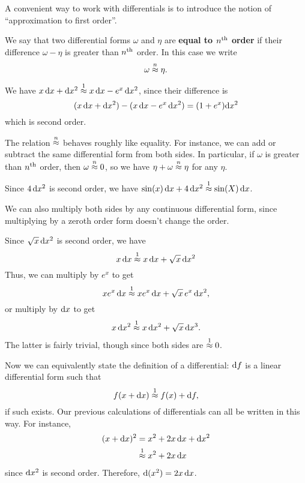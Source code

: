 \documentclass[12pt]{amsart}
\begin{document}
A convenient way to work with differentials is to introduce the notion of ``approximation to first order''.

\begin{defn}
  We say that two differential forms $\omega$ and $\eta$ are \textbf{equal to $n^{\mathrm{th}}$ order} if their difference $\omega-\eta$ is greater than $n^{\mathrm{th}}$ order.
  In this case we write
  \[\omega\mathrel{\overset{n}{\approx}} \eta.\]
\end{defn}

\begin{eg}
  We have $x\,\mathrm{d} x + \mathrm{d} x^2 \mathrel{\overset{1}{\approx}} x\,\mathrm{d} x - e^x \,\mathrm{d} x^2$, since their difference is
  \[ (x\,\mathrm{d} x + \mathrm{d} x^2) - (x\,\mathrm{d} x - e^x\, \mathrm{d} x^2) = (1+e^x)\mathrm{d} x^2 \]
  which is second order.
\end{eg}

The relation $\mathrel{\overset{n}{\approx}}$ behaves roughly like equality.
For instance, we can add or subtract the same differential form from both sides.
In particular, if $\omega$ is greater than $n^{\mathrm{th}}$ order, then $\omega\mathrel{\overset{n}{\approx}}0$, so we have $\eta + \omega \mathrel{\overset{n}{\approx}} \eta$ for any $\eta$.

\begin{eg}
  Since $4\,\mathrm{d} x^2$ is second order, we have $\sin(x) \,\mathrm{d} x + 4\, \mathrm{d} x^2 \mathrel{\overset{1}{\approx}} \sin(X)\,\mathrm{d} x$.
\end{eg}

We can also multiply both sides by any continuous differential form, since multiplying by a zeroth order form doesn't change the order.

\begin{eg}
  Since $\sqrt{x}\, \mathrm{d} x^2$ is second order, we have
  \[x\,\mathrm{d} x \mathrel{\overset{1}{\approx}} x\,\mathrm{d} x + \sqrt{x}\, \mathrm{d} x^2\]
  Thus, we can multiply by $e^x$ to get
  \[x e^x \,\mathrm{d} x \mathrel{\overset{1}{\approx}} x e^x\,\mathrm{d} x + \sqrt{x}\, e^x\, \mathrm{d} x^2,\]
  or multiply by $\mathrm{d} x$ to get
  \[x\,\mathrm{d} x^2 \mathrel{\overset{1}{\approx}} x\,\mathrm{d} x^2 + \sqrt{x} \,\mathrm{d} x^3. \]
  The latter is fairly trivial, though since both sides are $\mathrel{\overset{1}{\approx}} 0$.
\end{eg}

Now we can equivalently state the definition of a differential: $\mathrm{d} f$ is a linear differential form such that
\[ f(x+\mathrm{d} x) \mathrel{\overset{1}{\approx}} f(x) + \mathrm{d} f, \]
if such exists.
Our previous calculations of differentials can all be written in this way.
For instance,
\begin{align*}
  (x+\mathrm{d} x)^2 &= x^2 + 2 x\,\mathrm{d} x + \mathrm{d} x^2\\
  &\mathrel{\overset{1}{\approx}} x^2 + 2 x\,\mathrm{d} x
\end{align*}
since $\mathrm{d} x^2$ is second order.
Therefore, $\mathrm{d}(x^2) = 2x\,\mathrm{d} x$.
\end{document}
